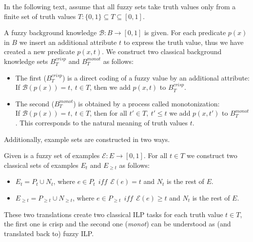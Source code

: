 \bigskip
In the following text, assume that all fuzzy sets take truth values only from a finite set of truth values $T: \{0,1\}\subseteq T\subseteq [0,1]$.

\begin{definition}
A fuzzy background knowledge ${\mathcal B}:B\longrightarrow [0,1]$ is given. For each predicate $p(x)$ in $B$ we insert an additional attribute $t$ to express the truth value, thus we have created a new predicate $p(x,t)$. We construct two classical background knowledge sets $B^{crisp}_T$ and $B^{monot}_T$  as follows:

\begin{itemize}
	\item The first ($B^{crisp}_T$) is a direct coding of a fuzzy value by an additional attribute:
\\If ${\mathcal B}(p(x))=t,\  t \in T$, then we add $p(x,t)$ to  ${B}^{crisp}_T$.
	\item The second ($B^{monot}_T$) is obtained by a process called monotonization:
\\If ${\mathcal B}(p(x))=t,\  t \in T$, then for all $t'\in T,\  t'\le t$ we add $p(x,t')$ to ${B}^{monot}_T$.
This corresponds to the natural meaning of truth values $t$.
\end{itemize}
\end{definition}



Additionally, example sets are constructed in two ways.
\begin{definition}
Given is a fuzzy set of examples ${\mathcal E}:E\longrightarrow [0,1]$. For all $t\in T$ we construct two classical sets of examples $E_t$ and $E_{\ge t}$  as follows:
\begin{itemize}
	\item $E_t=P_t\cup N_t$, where 
$e\in P_t \ \ iff \ \ {\mathcal E}(e)= t$
and $N_t$ is the rest of $E$.
	\item $E_{\ge t}=P_{\ge t}\cup N_{\ge t}$, where 
$e\in P_{\ge t} \ \ iff \ \ {\mathcal E}(e)\ge t$
and $N_t$ is the rest of $E$.
\end{itemize}
\end{definition}



These two translations create two classical ILP tasks for each truth value $t\in T$, the first one is crisp and the second one (\emph{monot}) can be understood as (and translated back to) fuzzy ILP.

